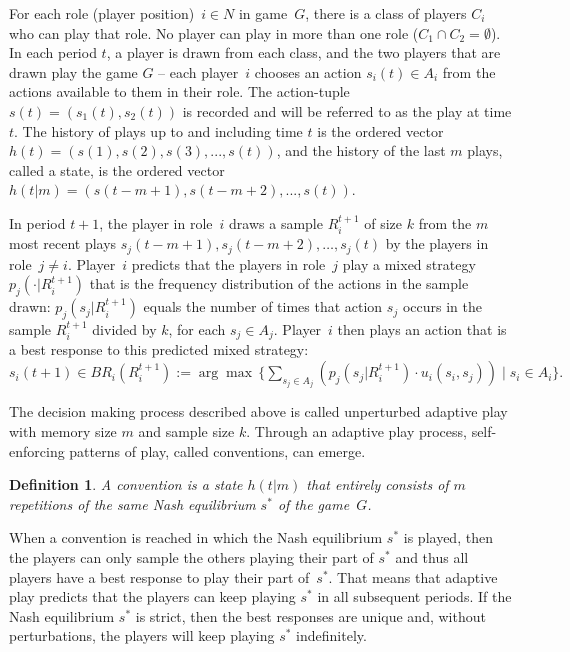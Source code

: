 \documentclass[11.5pt]{article}
\newtheorem{definition}{Definition}
\begin{document}
For each role (player position)~$i\in N$ in game~$G$, there is a class of players $C_i$ who can play that role. No player can play in more than one role ($C_1\cap C_2=\emptyset$). 
In each period $t$, a player is drawn from each class, and the two players that are drawn play the game $G$ -- each player~$i$ chooses an action $s_i(t)\in A_i$ from the actions available to them in their role. 
The action-tuple $s(t) = (s_1(t), s_2(t))$ is recorded and will be referred to as the play at time $t$. 
The history of plays up to and including time $t$ is the ordered vector $h(t) = (s(1), s(2), s(3), ..., s(t))$, and the history of the last $m$ plays, called a state, is the ordered vector $h(t|m) = (s(t-m+1), s(t-m+2), ..., s(t))$.

In period $t+1$, the player in role~$i$ draws a sample $R_i^{t+1}$ of size $k$ from the $m$ most recent plays $s_j(t-m+1), s_j(t-m+2), \ldots, s_j(t)$ by the players in role~$j\neq i$. 
Player~$i$ predicts that the players in role~$j$ play a mixed strategy $p_j(\cdot | R_i^{t+1})$ that is the frequency distribution of the actions in the sample drawn: $p_j(s_j | R_i^{t+1})$ equals the number of times that action $s_j$ occurs in the sample $R_i^{t+1}$ divided by $k$, for each $s_j\in A_j$. 
%
Player~$i$ then plays an action that is a best response to this predicted mixed strategy:  
$s_i(t+1)\in BR_i(R_i^{t+1}):=\arg\max \,\{ \sum_{s_j\in A_j} \left( p_j(s_j | R_i^{t+1})\cdot u_i(s_i,s_j) \right) \mid s_i\in A_i \} .$




\bigskip

The decision making process described above is called unperturbed adaptive play with memory size $m$ and sample size $k$. Through an adaptive play process, self-enforcing patterns of play, called conventions, can emerge.


\begin{definition}
A {\emph{convention}} is a state $h(t|m)$ that entirely consists of $m$ repetitions of the same Nash equilibrium $s^*$ of the game~$G$.
\end{definition}

When a convention is reached in which the Nash equilibrium $s^*$ is played, then the players can only sample the others playing their part of $s^*$ and thus all players have a best response to play their part of~$s^*$. That means that adaptive play predicts that the players can keep playing $s^*$ in all subsequent periods. If the Nash equilibrium $s^*$ is strict, then the best responses are unique and, without perturbations, the players will keep playing $s^*$ indefinitely. 
\end{document}
